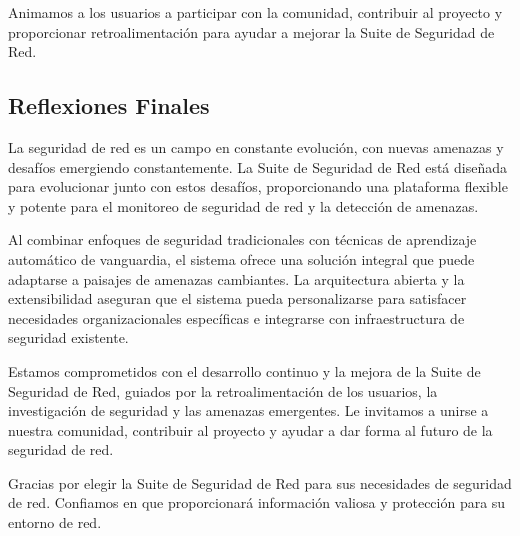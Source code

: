 Animamos a los usuarios a participar con la comunidad, contribuir al proyecto y proporcionar retroalimentación para ayudar a mejorar la Suite de Seguridad de Red.

\subsection{Reflexiones Finales}
La seguridad de red es un campo en constante evolución, con nuevas amenazas y desafíos emergiendo constantemente. La Suite de Seguridad de Red está diseñada para evolucionar junto con estos desafíos, proporcionando una plataforma flexible y potente para el monitoreo de seguridad de red y la detección de amenazas.

Al combinar enfoques de seguridad tradicionales con técnicas de aprendizaje automático de vanguardia, el sistema ofrece una solución integral que puede adaptarse a paisajes de amenazas cambiantes. La arquitectura abierta y la extensibilidad aseguran que el sistema pueda personalizarse para satisfacer necesidades organizacionales específicas e integrarse con infraestructura de seguridad existente.

Estamos comprometidos con el desarrollo continuo y la mejora de la Suite de Seguridad de Red, guiados por la retroalimentación de los usuarios, la investigación de seguridad y las amenazas emergentes. Le invitamos a unirse a nuestra comunidad, contribuir al proyecto y ayudar a dar forma al futuro de la seguridad de red.

Gracias por elegir la Suite de Seguridad de Red para sus necesidades de seguridad de red. Confiamos en que proporcionará información valiosa y protección para su entorno de red.